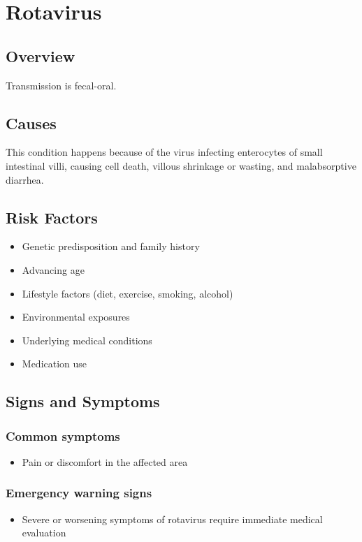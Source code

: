 \chapter{Rotavirus}
\label{sec:Rotavirus}

\section{Overview}
Transmission is fecal-oral.
\section{Causes}
This condition happens because of the virus infecting enterocytes of small intestinal villi, causing cell death, villous shrinkage or wasting, and malabsorptive diarrhea.     
\section{Risk Factors}

\begin{itemize}[noitemsep]
  \item Genetic predisposition and family history
  \item Advancing age
  \item Lifestyle factors (diet, exercise, smoking, alcohol)
  \item Environmental exposures
  \item Underlying medical conditions
  \item Medication use
\end{itemize}
\section{Signs and Symptoms}

\subsection{Common symptoms}
\begin{itemize}[noitemsep]
  \item Pain or discomfort in the affected area
  \end{itemize}

\subsection{Emergency warning signs}
\begin{itemize}[noitemsep]
  \item Severe or worsening symptoms of rotavirus require immediate medical evaluation
\end{itemize}
